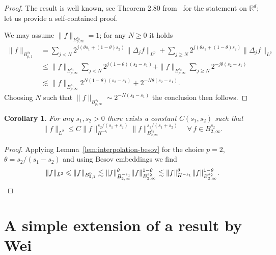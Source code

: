 \documentclass[11pt,oneside,reqno]{amsart}
\newtheorem{corollary}[theorem]{Corollary}
\numberwithin{equation}{section}
\begin{document}
\begin{proof}
  The result is well known, see Theorem 2.80 from~{\cite{bahouri}} for the
  statement on $\mathbb{R}^d$; let us provide a self-contained proof.
  
  We may assume $\| f \|_{B^{s_2}_{p, \infty}} = 1$; for any $N \geqslant 0$
  it holds
%  
  \begin{align*}
    \| f \|_{B^{s_{\theta}}_{p, 1}} & = \sum_{j < N} 2^{j (\theta s_1 + (1 -
    \theta) s_2)} \| \Delta_j f \|_{L^p} + \sum_{j \geqslant N} 2^{j (\theta
    s_1 + (1 - \theta) s_2)} \| \Delta_j f \|_{L^p}\\
    & \leqslant \| f \|_{B^{s_1}_{p, \infty}} \sum_{j < N} 2^{j (1 - \theta)
    (s_2 - s_1)} + \| f \|_{B^{s_2}_{p, \infty}} \sum_{j \geqslant N} 2^{- j
    \theta (s_2 - s_1)}\\
    & \lesssim \| f \|_{B^{s_1}_{p, \infty}} 2^{N (1 - \theta) (s_2 - s_1)} +
    2^{- N \theta (s_2 - s_1)} .
  \end{align*}
%
  Choosing $N$ such that $\| f \|_{B^{s_1}_{p, \infty}} \sim 2^{- N (s_2 -
  s_1)}$ the conclusion then follows.
\end{proof}

\begin{corollary}
  \label{cor:interpolation-besov}For any $s_1, s_2 > 0$ there exists a
  constant $C (s_1, s_2)$ such that
  \begin{equation}
    \| f \|_{L^2} \leqslant C \| f \|_{H^{- s_1}}^{s_2 / (s_1 + s_2)}  \| f
    \|_{B^{s_2}_{2, \infty}}^{s_1 / (s_1 + s_2)} \quad \forall \, f \in
    B^{s_2}_{2, \infty} . \label{eq:interpolation-besov-2}
  \end{equation}
\end{corollary}

\begin{proof}
  Applying Lemma~\ref{lem:interpolation-besov} for the choice $p = 2$, $\theta
  = s_2 / (s_1 - s_2)$ and using Besov embeddings we find
  \[ \| f \|_{L^2} \leqslant \| f \|_{B^0_{2, 1}} \lesssim \| f \|_{B^{-
     s_1}_{2, \infty}}^{\theta}  \| f \|^{1 - \theta}_{B^{s_2}_{2, \infty}}
     \lesssim \| f \|_{H^{- s_1}}^{\theta} \| f \|^{1 - \theta}_{B^{s_2}_{2,
     \infty}} . \qedhere \]
\end{proof}

\section{A simple extension of a result by Wei}\label{app:wei-extension}
\end{document}
